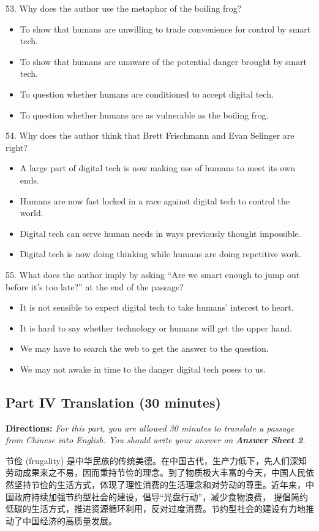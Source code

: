 \documentclass[UTF8,11pt]{ctexart}
\begin{document}
53. Why does the author use the metaphor of the boiling frog?


\begin{itemize}[leftmargin=2em,itemsep=.2em,topsep=.4em]\item[A.] To show that humans are unwilling to trade convenience for control by smart tech.
\item[B.] To show that humans are unaware of the potential danger brought by smart tech.
\item[C.] To question whether humans are conditioned to accept digital tech.
\item[D.] To question whether humans are as vulnerable as the boiling frog.
\end{itemize}

54. Why does the author think that Brett Frischmann and Evan Selinger are right?


\begin{itemize}[leftmargin=2em,itemsep=.2em,topsep=.4em]\item[A.] A large part of digital tech is now making use of humans to meet its own ends.
\item[B.] Humans are now fast locked in a race against digital tech to control the world.
\item[C.] Digital tech can serve human needs in ways previously thought impossible.
\item[D.] Digital tech is now doing thinking while humans are doing repetitive work.
\end{itemize}

55. What does the author imply by asking “Are we smart enough to jump out before it’s too late?” at the end of the passage?


\begin{itemize}[leftmargin=2em,itemsep=.2em,topsep=.4em]\item[A.] It is not sensible to expect digital tech to take humans’ interest to heart.
\item[B.] It is hard to say whether technology or humans will get the upper hand.
\item[C.] We may have to search the web to get the answer to the question.
\item[D.] We may not awake in time to the danger digital tech poses to us.
\end{itemize}

\subsection*{\textbf{Part IV Translation} \textbf{(30 minutes)}}


\textbf{Directions: }\textit{For this part, you are allowed 30 minutes to translate a passage from Chinese into English. You should} \textit{write your answer on }\textbf{\textit{Answer Sheet 2}}\textit{.}


节俭 (frugality) 是中华民族的传统美德。在中国古代，生产力低下，先人们深知劳动成果来之不易，因而秉持节俭的理念。到了物质极大丰富的今天，中国人民依然坚持节俭的生活方式，体现了理性消费的生活理念和对劳动的尊重。近年来，中国政府持续加强节约型社会的建设，倡导“光盘行动”，减少食物浪费， 提倡简约低碳的生活方式，推进资源循环利用，反对过度消费。节约型社会的建设有力地推动了中国经济的高质量发展。
\end{document}
